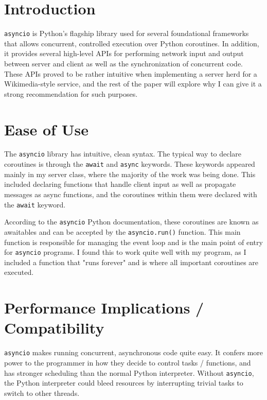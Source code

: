 \section{Introduction}
\verb +asyncio+ is Python's flagship library used for several foundational frameworks that allows concurrent, controlled execution over Python coroutines. In addition, it provides several high-level APIs for performing network input and output between server and client as well as the synchronization of concurrent code. These APIs proved to be rather intuitive when implementing a server herd for a Wikimedia-style service, and the rest of the paper will explore why I can give it a strong recommendation for such purposes. 

\section{Ease of Use}
The  \verb +asyncio+ library has intuitive, clean syntax. The typical way to declare coroutines is through the \verb +await+ and \verb +async+ keywords. These keywords appeared mainly in my server class, where the majority of the work was being done. This included declaring functions that handle client input as well as propagate messages as async functions, and the coroutines within them were declared with the \verb +await+ keyword. 

According to the \verb +asyncio+ Python documentation, these coroutines are known as awaitables and can be accepted by the \verb +asyncio.run()+ function. This main function is responsible for managing the event loop and is the main point of entry for \verb +asyncio+ programs. I found this to work quite well with my program, as I included a function that "runs forever" and is where all important coroutines are executed. 


\section{Performance Implications / Compatibility}
 \verb +asyncio+ makes running concurrent, asynchronous code quite easy. It confers more power to the programmer in how they decide to control tasks / functions, and has stronger scheduling than the normal Python interpreter. Without \verb +asyncio+, the Python interpreter could bleed resources by interrupting trivial tasks to switch to other threads. 

